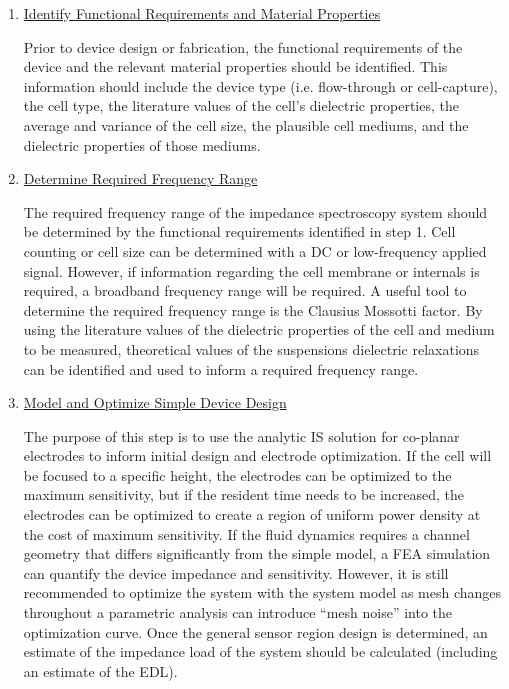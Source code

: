 \begin{enumerate}
    \item \underline{Identify Functional Requirements and Material Properties}
    \par Prior to device design or fabrication, the functional requirements of the device and the relevant material properties should be identified. This information should include the device type (i.e. flow-through or cell-capture), the cell type, the literature values of the cell's dielectric properties, the average and variance of the cell size, the plausible cell mediums, and the dielectric properties of those mediums.
    
    
    \item \underline{Determine Required Frequency Range}
    \par The required frequency range of the impedance spectroscopy system should be determined by the functional requirements identified in step 1. Cell counting or cell size can be determined with a DC or low-frequency applied signal. However, if information regarding the cell membrane or internals is required, a broadband frequency range will be required. A useful tool to determine the required frequency range is the Clausius Mossotti factor. By using the literature values of the dielectric properties of the cell and medium to be measured, theoretical values of the suspensions dielectric relaxations can be identified and used to inform a required frequency range.
    
    \item \underline{Model and Optimize Simple Device Design}
    \par The purpose of this step is to use the analytic IS solution for co-planar electrodes to inform initial design and electrode optimization. If the cell will be focused to a specific height, the electrodes can be optimized to the maximum sensitivity, but if the resident time needs to be increased, the electrodes can be optimized to create a region of uniform power density at the cost of maximum sensitivity. If the fluid dynamics requires a channel geometry that differs significantly from the simple model, a FEA simulation can quantify the device impedance and sensitivity.  However, it is still recommended to optimize the system with the system model as mesh changes throughout a parametric analysis can introduce “mesh noise” into the optimization curve. Once the general sensor region design is determined, an estimate of the impedance load of the system should be calculated (including an estimate of the EDL). 
    

\end{enumerate}
